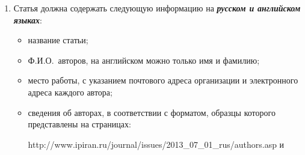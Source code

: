 {\begin{enumerate}[1.]
Основной текст: стиль~--- <<Обычный>>, шрифт~--- Times New Roman, размер~---
14~пунк\-тов, абзацный отступ~--- 0,5~см, 1,5~интервала, выравнивание~--- по ширине.

\pagebreak

\def\leftkol{Правила подготовки рукописей  для публикации в журнале
<<Информатика и её применения>>}

\def\rightkol{Правила подготовки рукописей  для публикации в журнале
<<Информатика и её применения>>}



Рекомендуемый объем рукописи~--- не свыше 20~страниц указанного формата.

Сокращения слов, помимо стандартных, не допускаются. Допускается минимальное
количество аббревиатур.


Все страницы рукописи нумеруются.

Шаблоны примеров оформления представлены в Интернете: {\sf
http://www.ipiran.ru/journal/\linebreak template.doc}\\[-13.5pt]

\item Статья должна содержать следующую информацию на {\bfseries\textit{русском и
английском языках}}:
\begin{itemize}
\item название статьи;
\item Ф.И.О.\ авторов, на английском можно только имя и фамилию;\\[-13.5pt]
\item место работы, с указанием почтового адреса организации и электронного адреса каждого
автора;\\[-13.5pt]
\item сведения об авторах, в соответствии с форматом, образцы которого
представлены на страницах:



\def\leftfootline{\small{\textbf{\thepage}
\hfill ИНФОРМАТИКА И ЕЁ ПРИМЕНЕНИЯ\ \ \ том\ 9\ \ \ выпуск\ 2\ \ \ 2015}
}%
 \def\rightfootline{\small{ИНФОРМАТИКА И ЕЁ ПРИМЕНЕНИЯ\ \ \ том\ 9\ \ \ выпуск\ 2\ \ \ 2015
\hfill \textbf{\thepage}}}



{\sf http://www.ipiran.ru/journal/issues/2013\_07\_01\_rus/authors.asp} и


\end{itemize}
\end{enumerate}}
